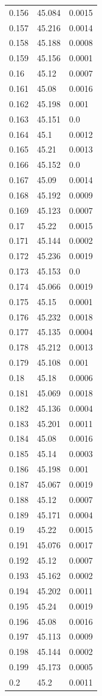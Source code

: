 \begin{table}[H]
\begin{tabular}{lll}
0.156 & 45.084 & 0.0015 \\
0.157 & 45.216 & 0.0014 \\
0.158 & 45.188 & 0.0008 \\
0.159 & 45.156 & 0.0001 \\
0.16 & 45.12 & 0.0007 \\
0.161 & 45.08 & 0.0016 \\
0.162 & 45.198 & 0.001 \\
0.163 & 45.151 & 0.0 \\
0.164 & 45.1 & 0.0012 \\
0.165 & 45.21 & 0.0013 \\
0.166 & 45.152 & 0.0 \\
0.167 & 45.09 & 0.0014 \\
0.168 & 45.192 & 0.0009 \\
0.169 & 45.123 & 0.0007 \\
0.17 & 45.22 & 0.0015 \\
0.171 & 45.144 & 0.0002 \\
0.172 & 45.236 & 0.0019 \\
0.173 & 45.153 & 0.0 \\
0.174 & 45.066 & 0.0019 \\
0.175 & 45.15 & 0.0001 \\
0.176 & 45.232 & 0.0018 \\
0.177 & 45.135 & 0.0004 \\
0.178 & 45.212 & 0.0013 \\
0.179 & 45.108 & 0.001 \\
0.18 & 45.18 & 0.0006 \\
0.181 & 45.069 & 0.0018 \\
0.182 & 45.136 & 0.0004 \\
0.183 & 45.201 & 0.0011 \\
0.184 & 45.08 & 0.0016 \\
0.185 & 45.14 & 0.0003 \\
0.186 & 45.198 & 0.001 \\
0.187 & 45.067 & 0.0019 \\
0.188 & 45.12 & 0.0007 \\
0.189 & 45.171 & 0.0004 \\
0.19 & 45.22 & 0.0015 \\
0.191 & 45.076 & 0.0017 \\
0.192 & 45.12 & 0.0007 \\
0.193 & 45.162 & 0.0002 \\
0.194 & 45.202 & 0.0011 \\
0.195 & 45.24 & 0.0019 \\
0.196 & 45.08 & 0.0016 \\
0.197 & 45.113 & 0.0009 \\
0.198 & 45.144 & 0.0002 \\
0.199 & 45.173 & 0.0005 \\
0.2 & 45.2 & 0.0011 \\
\bottomrule
\end{tabular}

\end{table}
